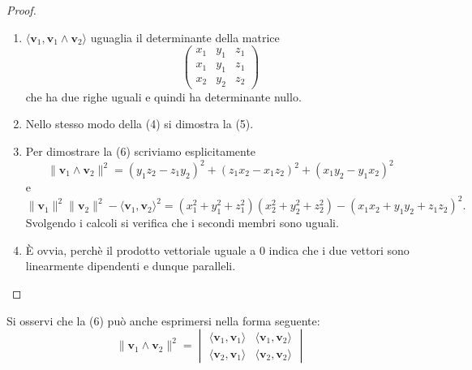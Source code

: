 \documentclass{article}
\theoremstyle{plain}
\theoremstyle{definition}
\theoremstyle{remark}
\begin{document}
\begin{proof}
\begin{enumerate}
\begin{enumerate}
        \end{enumerate}
    \item $\langle \mathbf{v}_1, \mathbf{v}_1 \wedge \mathbf{v}_2 \rangle$ uguaglia il determinante della matrice
    \[
    \begin{pmatrix}
    x_1 & y_1 & z_1\\
    x_1 & y_1 & z_1\\
    x_2 & y_2 & z_2
    \end{pmatrix}
    \]
    che ha due righe uguali e quindi ha determinante nullo.
    \item Nello stesso modo della (4) si dimostra la (5).
    \item Per dimostrare la (6) scriviamo esplicitamente
    \[
    \|\mathbf{v}_1 \wedge \mathbf{v}_2\|^2 = (y_1 z_2 - z_1 y_2)^2 + (z_1 x_2 - x_1 z_2)^2 + (x_1 y_2 - y_1 x_2)^2
    \]
    e
    \[
    \|\mathbf{v}_1\|^2 \|\mathbf{v}_2\|^2 - \langle \mathbf{v}_1, \mathbf{v}_2 \rangle^2 
    = (x_1^2 + y_1^2 + z_1^2)(x_2^2 + y_2^2 + z_2^2) - (x_1 x_2 + y_1 y_2 + z_1 z_2)^2.
    \]
    Svolgendo i calcoli si verifica che i secondi membri sono uguali.
    \item È ovvia, perchè il prodotto vettoriale uguale a $0$ indica che i due vettori sono linearmente dipendenti e dunque paralleli.
\end{enumerate}
\end{proof}

\vspace{10pt}

Si osservi che la (6) può anche esprimersi nella forma seguente:
\[
\|\mathbf{v}_1 \wedge \mathbf{v}_2\|^2 = 
\begin{vmatrix}
\langle \mathbf{v}_1, \mathbf{v}_1 \rangle & \langle \mathbf{v}_1, \mathbf{v}_2 \rangle \\
\langle \mathbf{v}_2, \mathbf{v}_1 \rangle & \langle \mathbf{v}_2, \mathbf{v}_2 \rangle
\end{vmatrix}
\]

\vspace{10pt}
\end{document}

